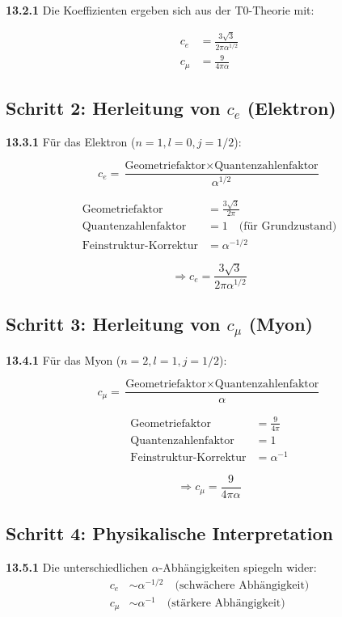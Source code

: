 \documentclass[12pt,a4paper]{article}
\begin{document}
\noindent \textbf{13.2.1} Die Koeffizienten ergeben sich aus der T0-Theorie mit:

\begin{align*}
	c_e &= \frac{3\sqrt{3}}{2\pi\alpha^{1/2}} \\
	c_\mu &= \frac{9}{4\pi\alpha}
\end{align*}

\subsection{Schritt 2: Herleitung von $c_e$ (Elektron)}

\noindent \textbf{13.3.1} Für das Elektron ($n=1, l=0, j=1/2$):

\[
c_e = \frac{\text{Geometriefaktor} \times \text{Quantenzahlenfaktor}}{\alpha^{1/2}}
\]

\begin{align*}
	\text{Geometriefaktor} &= \frac{3\sqrt{3}}{2\pi} \\
	\text{Quantenzahlenfaktor} &= 1 \quad \text{(für Grundzustand)} \\
	\text{Feinstruktur-Korrektur} &= \alpha^{-1/2}
\end{align*}

\[
\Rightarrow c_e = \frac{3\sqrt{3}}{2\pi\alpha^{1/2}}
\]

\subsection{Schritt 3: Herleitung von $c_\mu$ (Myon)}

\noindent \textbf{13.4.1} Für das Myon ($n=2, l=1, j=1/2$):

\[
c_\mu = \frac{\text{Geometriefaktor} \times \text{Quantenzahlenfaktor}}{\alpha}
\]

\begin{align*}
	\text{Geometriefaktor} &= \frac{9}{4\pi} \\
	\text{Quantenzahlenfaktor} &= 1 \\
	\text{Feinstruktur-Korrektur} &= \alpha^{-1}
\end{align*}

\[
\Rightarrow c_\mu = \frac{9}{4\pi\alpha}
\]

\subsection{Schritt 4: Physikalische Interpretation}

\noindent \textbf{13.5.1} Die unterschiedlichen $\alpha$-Abhängigkeiten spiegeln wider:
\begin{align*}
	c_e &\sim \alpha^{-1/2} \quad \text{(schwächere Abhängigkeit)} \\
	c_\mu &\sim \alpha^{-1} \quad \text{(stärkere Abhängigkeit)}
\end{align*}
\end{document}

